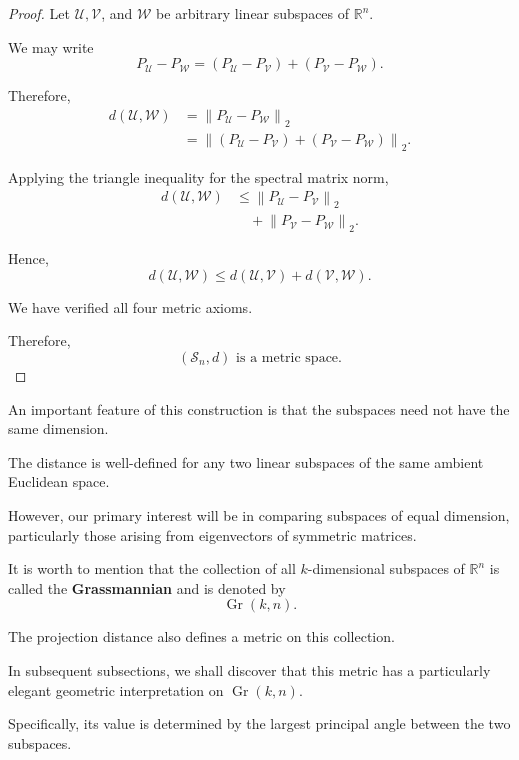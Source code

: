 \documentclass[14pt,letterpaper]{article}
\theoremstyle{plain}
\theoremstyle{definition}
\theoremstyle{remark}
\newcommand{\R}{\mathbb{R}}
\newcommand{\norm}[1]{\left\lVert #1 \right\rVert}
\begin{document}
\begin{proof}
Let $\mathcal U,\mathcal V$,
and $\mathcal W$ be arbitrary
linear subspaces of $\R^n$.

We may write
\[
P_{\mathcal U}-P_{\mathcal W}
=
\left(
P_{\mathcal U}-P_{\mathcal V}
\right)
+
\left(
P_{\mathcal V}-P_{\mathcal W}
\right).
\]

Therefore,
\[
\begin{aligned}
d(\mathcal U,\mathcal W)
&=
\norm{
P_{\mathcal U}-P_{\mathcal W}
}_2\\[4pt]
&=
\norm{
(P_{\mathcal U}-P_{\mathcal V})
+
(P_{\mathcal V}-P_{\mathcal W})
}_2.
\end{aligned}
\]

Applying the triangle inequality
for the spectral matrix norm,
\[
\begin{aligned}
d(\mathcal U,\mathcal W)
&\leq
\norm{
P_{\mathcal U}-P_{\mathcal V}
}_2\\
&\quad+
\norm{
P_{\mathcal V}-P_{\mathcal W}
}_2.
\end{aligned}
\]

Hence,
\[
\boxed{
d(\mathcal U,\mathcal W)
\leq
d(\mathcal U,\mathcal V)
+
d(\mathcal V,\mathcal W).
}
\]

We have verified all four
metric axioms.

Therefore,
\[
\boxed{
(\mathscr S_n,d)
\text{ is a metric space.}
}
\]

\end{proof}

An important feature of this
construction is that the
subspaces need not have
the same dimension.

The distance is well-defined
for any two linear subspaces
of the same ambient Euclidean
space.

However, our primary interest
will be in comparing subspaces
of equal dimension, particularly
those arising from eigenvectors
of symmetric matrices.

It is worth to mention that the collection of all
$k$-dimensional subspaces
of $\R^n$ is called the
\textbf{Grassmannian} and is denoted by
\[
\boxed{
\operatorname{Gr}(k,n).
}
\]

The projection distance
also defines a metric on
this collection.

In subsequent subsections,
we shall discover that this
metric has a particularly
elegant geometric interpretation
on $\operatorname{Gr}(k,n)$.

Specifically, its value is
determined by the largest
principal angle between
the two subspaces.
\end{document}
